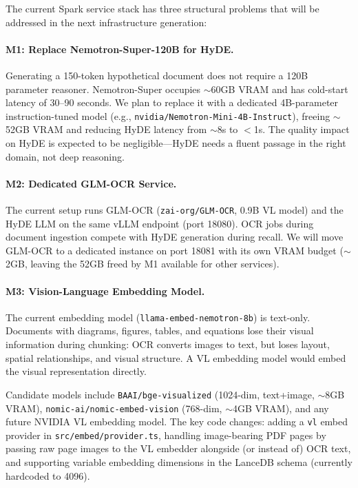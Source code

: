 \documentclass[11pt]{article}
\begin{document}
The current Spark service stack has three structural problems that will be addressed in
the next infrastructure generation:

\paragraph{M1: Replace Nemotron-Super-120B for HyDE.}
Generating a 150-token hypothetical document does not require a 120B parameter reasoner.
Nemotron-Super occupies $\sim$60GB VRAM and has cold-start latency of 30--90 seconds.
We plan to replace it with a dedicated 4B-parameter instruction-tuned model
(e.g., \texttt{nvidia/Nemotron-Mini-4B-Instruct}), freeing $\sim$52GB VRAM and
reducing HyDE latency from $\sim$8s to $<$1s. The quality impact on HyDE is expected
to be negligible---HyDE needs a fluent passage in the right domain, not deep reasoning.

\paragraph{M2: Dedicated GLM-OCR Service.}
The current setup runs GLM-OCR (\texttt{zai-org/GLM-OCR}, 0.9B VL model) and the HyDE
LLM on the same vLLM endpoint (port 18080). OCR jobs during document ingestion compete
with HyDE generation during recall. We will move GLM-OCR to a dedicated instance on
port 18081 with its own VRAM budget ($\sim$2GB, leaving the 52GB freed by M1 available
for other services).

\paragraph{M3: Vision-Language Embedding Model.}
The current embedding model (\texttt{llama-embed-nemotron-8b}) is text-only. Documents
with diagrams, figures, tables, and equations lose their visual information during
chunking: OCR converts images to text, but loses layout, spatial relationships, and
visual structure. A VL embedding model would embed the visual representation directly.

Candidate models include \texttt{BAAI/bge-visualized} (1024-dim, text+image, $\sim$8GB
VRAM), \texttt{nomic-ai/nomic-embed-vision} (768-dim, $\sim$4GB VRAM), and any future
NVIDIA VL embedding model. The key code changes: adding a \texttt{vl} embed provider in
\texttt{src/embed/provider.ts}, handling image-bearing PDF pages by passing raw page images
to the VL embedder alongside (or instead of) OCR text, and supporting variable embedding
dimensions in the LanceDB schema (currently hardcoded to 4096).
\end{document}
